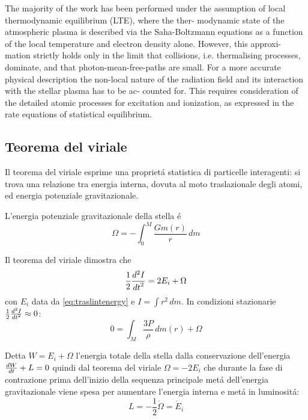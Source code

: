 \documentclass[../main.tex]{subfiles}
\begin{document}
\begin{workout}

The majority of the work has been performed under the assumption of local thermodynamic equilibrium (LTE), where the ther- modynamic state of the atmospheric plasma is described via the Saha-Boltzmann equations as a function of the local temperature and electron density alone. However, this approxi- mation strictly holds only in the limit that collisions, i.e. thermalising processes, dominate, and that photon-mean-free-paths are small. For a more accurate physical description the non-local nature of the radiation field and its interaction with the stellar plasma has to be ac- counted for. This requires consideration of the detailed atomic processes for excitation and ionization, as expressed in the rate equations of statistical equilibrium.

\end{workout}

\subsection{Teorema del viriale}

Il teorema del viriale esprime una propriet\'a statistica di particelle interagenti: si trova una relazione tra energia interna, dovuta al moto traslazionale degli atomi, ed energia potenziale gravitazionale.

L'energia potenziale gravitazionale della stella \'e
\begin{equation}
\Omega=-\int_0^M\frac{Gm(r)}{r}\,dm\label{eq:energiapg}
\end{equation}

Il teorema del viriale dimostra che
\begin{equation}
\frac{1}{2}\TtwoDy{t}{I}=2E_i+\Omega
\end{equation}
con $E_i$ data da \eqref{eq:traslintenergy} e $I=\int r^2\,dm$. In condizioni stazionarie $\frac{1}{2}\TtwoDy{t}{I}\approx0$:
\begin{equation}
0=\int_M\frac{3P}{\rho}\,dm(r)+\Omega
\end{equation}

Detta $W=E_i+\Omega$ l'energia totale della stella dalla conservazione dell'energia $\TDy{t}{W}+L=0$ quindi dal teorema del viriale $\Omega=-2E_i$ che durante la fase di contrazione prima dell'inizio della sequenza principale met\'a dell'energia gravitazionale viene spesa per aumentare l'energia interna e met\'a in luminosit\'a:
\begin{equation}
L=-\frac{1}{2}\dot{\Omega}=\dot{E}_i
\end{equation}
\end{document}
